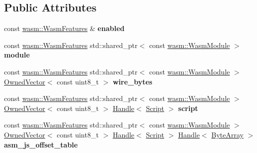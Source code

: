 \subsection*{Public Attributes}
\begin{DoxyCompactItemize}
\item 
\mbox{\label{classv8_1_1internal_1_1WasmModuleObject_a04470ea4b3068da73f2ab6aafe04f1f7}} 
const \mbox{\hyperlink{structv8_1_1internal_1_1wasm_1_1WasmFeatures}{wasm\+::\+Wasm\+Features}} \& {\bfseries enabled}
\item 
\mbox{\label{classv8_1_1internal_1_1WasmModuleObject_acc475920f7ff3c9c49acba61ddb977c9}} 
const \mbox{\hyperlink{structv8_1_1internal_1_1wasm_1_1WasmFeatures}{wasm\+::\+Wasm\+Features}} std\+::shared\+\_\+ptr$<$ const \mbox{\hyperlink{structv8_1_1internal_1_1wasm_1_1WasmModule}{wasm\+::\+Wasm\+Module}} $>$ {\bfseries module}
\item 
\mbox{\label{classv8_1_1internal_1_1WasmModuleObject_a3603a6dc806a5d298fe37e5d0d99fdda}} 
const \mbox{\hyperlink{structv8_1_1internal_1_1wasm_1_1WasmFeatures}{wasm\+::\+Wasm\+Features}} std\+::shared\+\_\+ptr$<$ const \mbox{\hyperlink{structv8_1_1internal_1_1wasm_1_1WasmModule}{wasm\+::\+Wasm\+Module}} $>$ \mbox{\hyperlink{classv8_1_1internal_1_1OwnedVector}{Owned\+Vector}}$<$ const uint8\+\_\+t $>$ {\bfseries wire\+\_\+bytes}
\item 
\mbox{\label{classv8_1_1internal_1_1WasmModuleObject_ae9f2b3bed4c89bc3ada7121d586f0217}} 
const \mbox{\hyperlink{structv8_1_1internal_1_1wasm_1_1WasmFeatures}{wasm\+::\+Wasm\+Features}} std\+::shared\+\_\+ptr$<$ const \mbox{\hyperlink{structv8_1_1internal_1_1wasm_1_1WasmModule}{wasm\+::\+Wasm\+Module}} $>$ \mbox{\hyperlink{classv8_1_1internal_1_1OwnedVector}{Owned\+Vector}}$<$ const uint8\+\_\+t $>$ \mbox{\hyperlink{classv8_1_1internal_1_1Handle}{Handle}}$<$ \mbox{\hyperlink{classv8_1_1internal_1_1Script}{Script}} $>$ {\bfseries script}
\item 
\mbox{\label{classv8_1_1internal_1_1WasmModuleObject_a9ad8c372fd0a8d4a4c5bf063e7a2cdbc}} 
const \mbox{\hyperlink{structv8_1_1internal_1_1wasm_1_1WasmFeatures}{wasm\+::\+Wasm\+Features}} std\+::shared\+\_\+ptr$<$ const \mbox{\hyperlink{structv8_1_1internal_1_1wasm_1_1WasmModule}{wasm\+::\+Wasm\+Module}} $>$ \mbox{\hyperlink{classv8_1_1internal_1_1OwnedVector}{Owned\+Vector}}$<$ const uint8\+\_\+t $>$ \mbox{\hyperlink{classv8_1_1internal_1_1Handle}{Handle}}$<$ \mbox{\hyperlink{classv8_1_1internal_1_1Script}{Script}} $>$ \mbox{\hyperlink{classv8_1_1internal_1_1Handle}{Handle}}$<$ \mbox{\hyperlink{classv8_1_1internal_1_1ByteArray}{Byte\+Array}} $>$ {\bfseries asm\+\_\+js\+\_\+offset\+\_\+table}
\end{DoxyCompactItemize}
